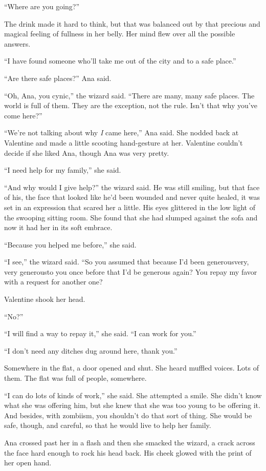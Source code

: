 “Where are you going?”

The drink made it hard to think, but that was balanced out by that
precious and magical feeling of fullness in her belly. Her mind
flew over all the possible answers.

“I have found someone who’ll take me out of the city and to a safe
place.”

“Are there safe places?” Ana said.

“Oh, Ana, you cynic,” the wizard said. “There are many, many safe
places. The world is full of them. They are the exception, not the
rule. Isn’t that why you’ve come here?”

“We’re not talking about why \emph{I} came here,” Ana said. She
nodded back at Valentine and made a little scooting hand-gesture at
her. Valentine couldn’t decide if she liked Ana, though Ana was
very pretty.

“I need help for my family,” she said.

“And why would I give help?” the wizard said. He was still smiling,
but that face of his, the face that looked like he’d been wounded
and never quite healed, it was set in an expression that scared her
a little. His eyes glittered in the low light of the swooping
sitting room. She found that she had slumped against the sofa and
now it had her in its soft embrace.

“Because you helped me before,” she said.

“I see,” the wizard said. “So you assumed that because I’d been
generous\dash{}very, very generous\dash{}to you once before that I’d be
generous again? You repay my favor with a request for another one?

Valentine shook her head.

“No?”

“I will find a way to repay it,” she said. “I can work for you.”

“I don’t need any ditches dug around here, thank you.”

Somewhere in the flat, a door opened and shut. She heard muffled
voices. Lots of them. The flat was full of people, somewhere.

“I can do lots of kinds of work,” she said. She attempted a smile.
She didn’t know what she was offering him, but she knew that she
was too young to be offering it. And besides, with zombiism, you
shouldn’t do that sort of thing. She would be safe, though, and
careful, so that he would live to help her family.

Ana crossed past her in a flash and then she smacked the wizard, a
crack across the face hard enough to rock his head back. His cheek
glowed with the print of her open hand.

